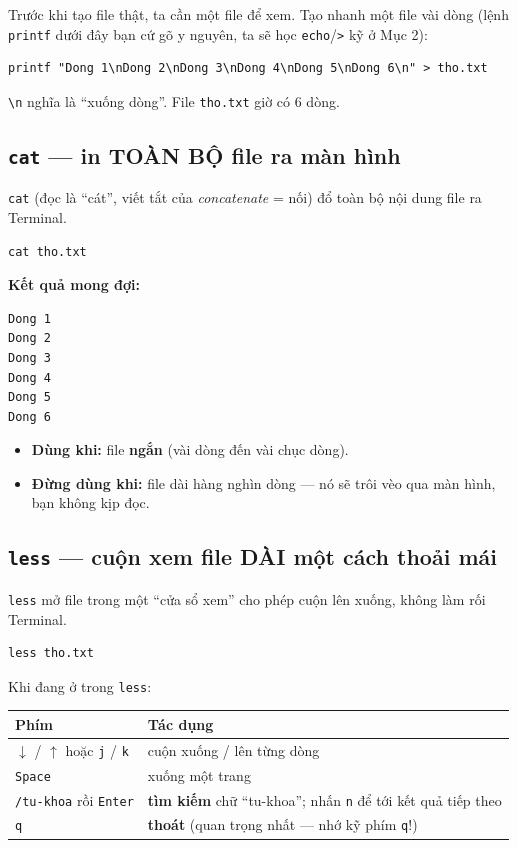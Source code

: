 \documentclass[12pt,a4paper]{article}
\newcommand{\cmd}[1]{\texttt{#1}}
\begin{document}
Trước khi tạo file thật, ta cần một file để xem. Tạo nhanh một file vài dòng (lệnh \cmd{printf} dưới đây bạn cứ gõ y nguyên, ta sẽ học \cmd{echo}/\cmd{>} kỹ ở Mục 2):

\begin{Verbatim}
printf "Dong 1\nDong 2\nDong 3\nDong 4\nDong 5\nDong 6\n" > tho.txt
\end{Verbatim}

\cmd{\textbackslash n} nghĩa là ``xuống dòng''. File \cmd{tho.txt} giờ có 6 dòng.

\subsection{\texttt{cat} --- in TOÀN BỘ file ra màn hình}

\cmd{cat} (đọc là ``cát'', viết tắt của \textit{concatenate} = nối) đổ toàn bộ nội dung file ra Terminal.

\begin{Verbatim}
cat tho.txt
\end{Verbatim}

\textbf{Kết quả mong đợi:}
\begin{Verbatim}
Dong 1
Dong 2
Dong 3
Dong 4
Dong 5
Dong 6
\end{Verbatim}

\begin{itemize}[leftmargin=1.4em]
\item \textbf{Dùng khi:} file \textbf{ngắn} (vài dòng đến vài chục dòng).
\item \textbf{Đừng dùng khi:} file dài hàng nghìn dòng --- nó sẽ trôi vèo qua màn hình, bạn không kịp đọc.
\end{itemize}

\subsection{\texttt{less} --- cuộn xem file DÀI một cách thoải mái}

\cmd{less} mở file trong một ``cửa sổ xem'' cho phép cuộn lên xuống, không làm rối Terminal.

\begin{Verbatim}
less tho.txt
\end{Verbatim}

Khi đang ở trong \cmd{less}:

\begin{center}
\begin{tabular}{>{\raggedright\arraybackslash}p{5.5cm} >{\raggedright\arraybackslash}p{8cm}}
\rowcolor{seniorbluebg}
\textbf{Phím} & \textbf{Tác dụng} \\
\hline
$\downarrow$ / $\uparrow$ hoặc \cmd{j} / \cmd{k} & cuộn xuống / lên từng dòng \\
\cmd{Space} & xuống một trang \\
\cmd{/tu-khoa} rồi \cmd{Enter} & \textbf{tìm kiếm} chữ ``tu-khoa''; nhấn \cmd{n} để tới kết quả tiếp theo \\
\cmd{q} & \textbf{thoát} (quan trọng nhất --- nhớ kỹ phím \cmd{q}!) \\
\end{tabular}
\end{center}
\end{document}
